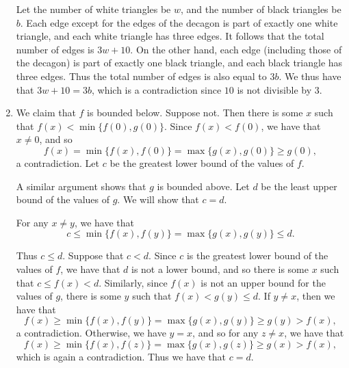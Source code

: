 \documentclass[12pt]{article}
\begin{document}
\begin{enumerate}
%
Let the number of white triangles be $w$, and the number of black triangles be
$b$. Each edge except for the edges of the decagon is part of exactly one white
triangle, and each white triangle has three edges. It follows that the total
number of edges is $3w + 10$. On the other hand, each edge (including those of
the decagon) is part of exactly one black triangle, and each black triangle has
three edges. Thus the total number of edges is also equal to $3b$. We thus have
that $3w + 10 = 3b$, which is a contradiction since $10$ is not divisible by
$3$.


\item %
We claim that $f$ is bounded below. Suppose not. Then there is some $x$ such
that $f(x) < \min\{f(0), g(0) \}$. Since $f(x) < f(0)$, we have that $x \neq 0$,
and so
\[
    f(x) = \min\{ f(x), f(0) \} = \max\{ g(x), g(0) \} \geq g(0),
\]
a contradiction. Let $c$ be the greatest lower bound of the values of $f$.

A similar argument shows that $g$ is bounded above. Let $d$ be the least upper
bound of the values of $g$. We will show that $c = d$.

For any $x \neq y$, we have that
\[
    c \leq \min\{ f(x), f(y) \} = \max\{ g(x), g(y) \} \leq d.   
\]

Thus $c \leq d$. Suppose that $c < d$. Since $c$ is the greatest lower bound of
the values of $f$, we have that $d$ is not a lower bound, and so there is some
$x$ such that $c \leq f(x) < d$. Similarly, since $f(x)$ is not an upper bound
for the values of $g$, there is some $y$ such that $f(x) < g(y) \leq d$. If $y
\neq x$, then we have that
\[
    f(x) \geq \min\{ f(x), f(y) \} = \max\{ g(x), g(y) \} \geq g(y) > f(x),
\]
a contradiction. Otherwise, we have $y = x$, and so for any $z \neq x$, we have
that
\[
    f(x) \geq \min\{ f(x), f(z) \} = \max\{ g(x), g(z) \} \geq g(x) > f(x),
\]
which is again a contradiction. Thus we have that $c = d$.


\end{enumerate}
\end{document}
